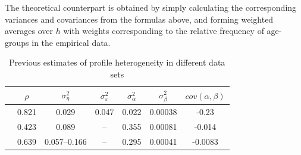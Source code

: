 The theoretical counterpart is obtained by simply calculating the corresponding
variances and covariances from the formulas above, and forming weighted averages
over $h$ with weights corresponding to the relative frequency of age-groups in
the empirical data.
\begin{table}
\begin{tabular}{l|c|c|c|c|c|c}
\hline
                        & $\rho$ & $\sigma^2_{\eta}$ & $\sigma^2_{\varepsilon}$ & $\sigma^2_{\alpha}$ & $\sigma^2_{\beta}$ & $cov(\alpha,\beta)$ \\
                        \hline
\citet{Guvenen2009}     & 0.821  &   0.029           &    0.047                 &     0.022           &       0.00038      &      -0.23           \\
\citet{Baker1997}       & 0.423  &   0.089           &     --                   &     0.355           &       0.00081      &      -0.014          \\
\citet{Haider2001}      & 0.639  & 0.057--0.166      &     --                   &     0.295           &       0.00041      &      -0.0083 \\
\hline
\end{tabular}
\caption{Previous estimates of profile heterogeneity in different data sets}
\label{tab:hip_literature}
\end{table}

